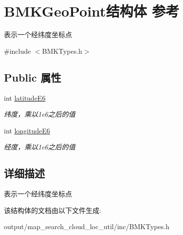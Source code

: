 \hypertarget{struct_b_m_k_geo_point}{\section{B\+M\+K\+Geo\+Point结构体 参考}
\label{struct_b_m_k_geo_point}
}


表示一个经纬度坐标点  




{\ttfamily \#include $<$B\+M\+K\+Types.\+h$>$}

\subsection*{Public 属性}
\begin{DoxyCompactItemize}
\item 
\hypertarget{struct_b_m_k_geo_point_ad6f5b38335cff314e953e9b7eb5c7b39}{int \hyperlink{struct_b_m_k_geo_point_ad6f5b38335cff314e953e9b7eb5c7b39}{latitude\+E6}}\label{struct_b_m_k_geo_point_ad6f5b38335cff314e953e9b7eb5c7b39}

\begin{DoxyCompactList}\small\item\em 纬度，乘以1e6之后的值 \end{DoxyCompactList}\item 
\hypertarget{struct_b_m_k_geo_point_aac3f3dc0ae09785e5b70c319b68d4047}{int \hyperlink{struct_b_m_k_geo_point_aac3f3dc0ae09785e5b70c319b68d4047}{longitude\+E6}}\label{struct_b_m_k_geo_point_aac3f3dc0ae09785e5b70c319b68d4047}

\begin{DoxyCompactList}\small\item\em 经度，乘以1e6之后的值 \end{DoxyCompactList}\end{DoxyCompactItemize}


\subsection{详细描述}
表示一个经纬度坐标点 

该结构体的文档由以下文件生成\+:\begin{DoxyCompactItemize}
\item 
output/map\+\_\+search\+\_\+cloud\+\_\+loc\+\_\+util/inc/B\+M\+K\+Types.\+h\end{DoxyCompactItemize}
